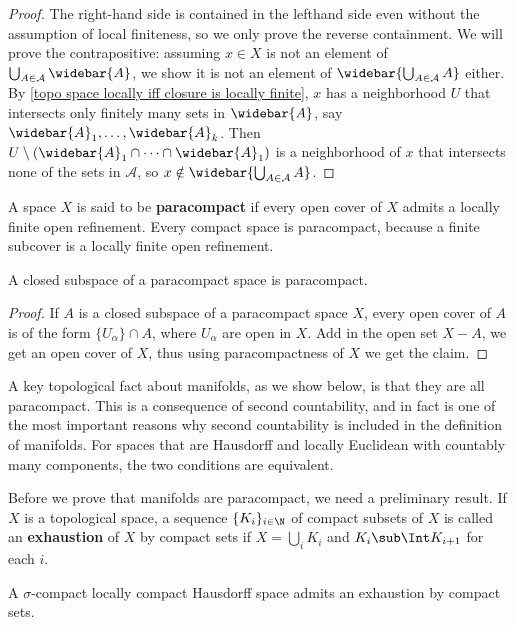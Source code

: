 \begin{proof}
The right-hand side is contained in the lefthand side even without the assumption of local finiteness, so we only prove the reverse containment. We will prove the contrapositive: assuming $x\in X$ is not an element of $\bigcup_{A\in\mathcal{A}}\widebar{A}$, we show it is not an element of $\widebar{\bigcup_{A\in\mathcal{A}} A}$ either. By \cref{topo space locally iff closure is locally finite},
$x$ has a neighborhood $U$ that intersects only finitely many sets in $\widebar{A}$, say $\widebar{A}_1,\dots,\widebar{A}_k$. Then $U\setminus(\widebar{A}_1\cap\cdots\cap\widebar{A}_1)$ is a neighborhood of $x$ that intersects none of the sets in $\mathcal{A}$, so $x\notin\widebar{\bigcup_{A\in\mathcal{A}} A}$.
\end{proof}
\begin{definition}
A space $X$ is said to be \textbf{paracompact} if every open cover of $X$ admits a locally finite open refinement. Every compact space is paracompact, because a finite subcover is a locally finite open refinement.
\end{definition}
\begin{proposition}
A closed subspace of a paracompact space is paracompact.
\end{proposition}
\begin{proof}
If $A$ is a closed subspace of a paracompact space $X$, every open cover of $A$ is of the form $\{U_\alpha\}\cap A$, where $U_\alpha$ are open in $X$. Add in the open set $X-A$, we get an open cover of $X$, thus using paracompactness of $X$ we get the claim.
\end{proof}
A key topological fact about manifolds, as we show below, is that they are all paracompact. This is a consequence of second countability, and in fact is one of the most important reasons why second countability is included in the definition of manifolds. For spaces that are Hausdorff and locally Euclidean with countably many components, the two conditions are equivalent.\par
Before we prove that manifolds are paracompact, we need a preliminary result. If $X$ is a topological space, a sequence $\{K_i\}_{i\in\N}$ of compact subsets of $X$ is called an \textbf{exhaustion} of $X$ by compact sets if $X=\bigcup_{i}K_i$ and $K_i\sub\Int K_{i+1}$ for each $i$.
\begin{proposition}\label{exhaustion by compact}
A $\sigma$-compact locally compact Hausdorff space admits an exhaustion by compact sets.
\end{proposition}
